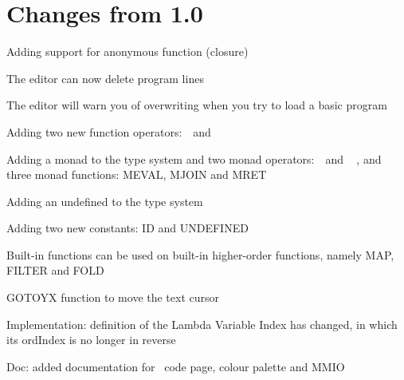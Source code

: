 \chapter{Changes from 1.0}

\begin{itemlist}
\item Adding support for anonymous function (closure)
\item The editor can now delete program lines
\item The editor will warn you of overwriting when you try to load a basic program
\item Adding two new function operators: \basicapply\ \,and\ \,\basiccompo
\item Adding a monad to the type system and two monad operators: \basicmbind\ \,and\ \,\basicmseq\ , and three monad functions: MEVAL, MJOIN and MRET
\item Adding an undefined to the type system
\item Adding two new constants: ID and UNDEFINED
\item Built-in functions can be used on built-in higher-order functions, namely MAP, FILTER and FOLD
\item GOTOYX function to move the text cursor
\item Implementation: definition of the Lambda Variable Index has changed, in which its ordIndex is no longer in reverse
\item Doc: added documentation for \thismachine\ code page, colour palette and MMIO
\end{itemlist}
